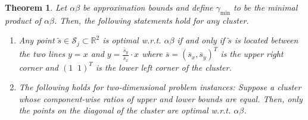 \documentclass{article}
\newtheorem{theorem}{Theorem}[section]
\newcommand{\mS}{\mathcal{S}}
\begin{document}
\begin{theorem}
	\label{theorem:alpha_beta}
	Let $\alpha\beta$ be approximation bounds and define $\gamma_{\min}$ to be the minimal product of $\alpha\beta$. Then, the following statements hold for any cluster.
	\begin{enumerate}
	\item Any point $\tilde{s} \in \mS_j \subset \mathbb{R}^2$ is optimal w.r.t. $\alpha\beta$ if and only if $\tilde{s}$ is located between the two lines $y=x$ and $y=\frac{\overline{s}_y}{\overline{s}_x} \cdot x$ where $\overline{s} =(\overline{s}_x, \overline{s}_y)^T$ is the upper right corner and $(1 \;\; 1)^T$ is the lower left corner of the cluster.
	\item The following holds for two-dimensional problem instances:
	Suppose a cluster whose component-wise ratios of upper and lower bounds are equal. Then, only the points on the diagonal of the cluster are optimal w.r.t. $\alpha\beta$.
	\end{enumerate}
	\end{theorem}
	\vspace{.25cm}
\end{document}
